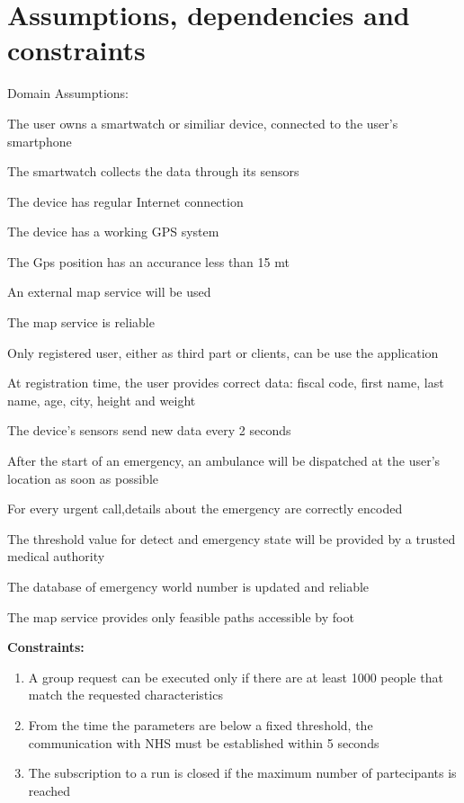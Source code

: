 \section{Assumptions, dependencies and constraints}
Domain Assumptions:
\begin{enumerate}[label={[}D.\arabic*{]}]

\item \label{d:1}
The user owns a smartwatch or similiar device, connected to the user’s smartphone
\item\label{d:2}
The smartwatch collects the data through its sensors
\item\label{d:3}
The device has regular Internet connection 
\item\label{d:4}
The device has a working GPS system 
\item\label{d:4}
The Gps position has an accurance less than 15 mt
\item\label{d:5}
An external map service will be used
\item\label{d:6}
The map service is reliable
\item\label{d:7}
Only registered user, either as third part or clients, can be use the application
\item\label{d:8}
At registration time, the user provides correct data: fiscal code, first name, last name, age, city, height and weight
\item\label{d:9}
The device’s sensors send new data every 2 seconds
\item\label{d:10}
After the start of an emergency, an ambulance will be dispatched at the user’s location as soon as possible
\item\label{d:11}
For every urgent call,details about the emergency are correctly encoded
\item\label{d:12}
The threshold value for detect and emergency state will be provided by a trusted medical authority
\item\label{d:13}
The database of emergency world number is updated and reliable
\item\label{d:14}
The map service provides only feasible paths accessible by foot
\end{enumerate}

\textbf{Constraints:}

\begin{enumerate}
    \item\label{c:1}	A group request can be executed only if there are at least 1000 people that match the requested characteristics 
    \item\label{c:2}
    From the time the parameters are below a fixed threshold, the communication with NHS must be established within 5 seconds
    \item\label{c:3}
    The subscription to a run is closed if the maximum number of partecipants is reached
\end{enumerate}



